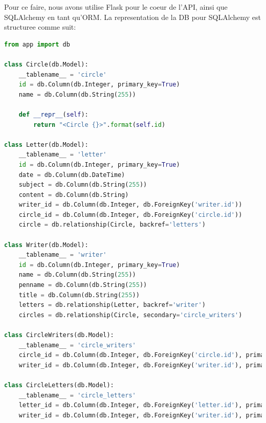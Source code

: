 \documentclass[a4paper, 12pt]{article}
\begin{document}
Pour ce faire, nous avons utilise Flask pour le coeur de l'API, ainsi
que SQLAlchemy en tant qu'ORM. La representation de la DB pour SQLAlchemy est structuree comme suit:
\vspace{1cm}
\begin{lstlisting}[language=python]
from app import db

class Circle(db.Model):
    __tablename__ = 'circle'
    id = db.Column(db.Integer, primary_key=True)
    name = db.Column(db.String(255))

    def __repr__(self):
        return "<Circle {}>".format(self.id)

class Letter(db.Model):
    __tablename__ = 'letter'
    id = db.Column(db.Integer, primary_key=True)
    date = db.Column(db.DateTime)
    subject = db.Column(db.String(255))
    content = db.Column(db.String)
    writer_id = db.Column(db.Integer, db.ForeignKey('writer.id'))
    circle_id = db.Column(db.Integer, db.ForeignKey('circle.id'))
    circle = db.relationship(Circle, backref='letters')

class Writer(db.Model):
    __tablename__ = 'writer'
    id = db.Column(db.Integer, primary_key=True)
    name = db.Column(db.String(255))
    penname = db.Column(db.String(255))
    title = db.Column(db.String(255))
    letters = db.relationship(Letter, backref='writer')
    circles = db.relationship(Circle, secondary='circle_writers')

class CircleWriters(db.Model):
    __tablename__ = 'circle_writers'
    circle_id = db.Column(db.Integer, db.ForeignKey('circle.id'), primary_key=True)
    writer_id = db.Column(db.Integer, db.ForeignKey('writer.id'), primary_key=True)

class CircleLetters(db.Model):
    __tablename__ = 'circle_letters'
    letter_id = db.Column(db.Integer, db.ForeignKey('letter.id'), primary_key=True)
    writer_id = db.Column(db.Integer, db.ForeignKey('writer.id'), primary_key=True) 
\end{lstlisting}
\end{document}
